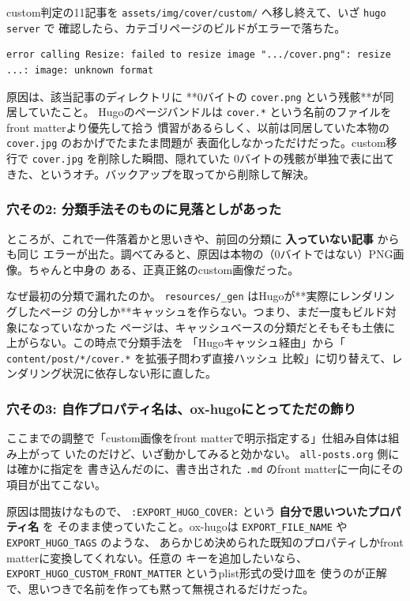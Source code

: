 \documentclass[11pt]{article}
\begin{document}
custom判定の11記事を \texttt{assets/img/cover/custom/} へ移し終えて、いざ \texttt{hugo server} で
確認したら、カテゴリページのビルドがエラーで落ちた。

\begin{verbatim}
error calling Resize: failed to resize image ".../cover.png": resize ...: image: unknown format
\end{verbatim}

原因は、該当記事のディレクトリに **0バイトの \texttt{cover.png} という残骸**が同居していたこと。
Hugoのページバンドルは \texttt{cover.*} という名前のファイルをfront matterより優先して拾う
慣習があるらしく、以前は同居していた本物の \texttt{cover.jpg} のおかげでたまたま問題が
表面化しなかっただけだった。custom移行で \texttt{cover.jpg} を削除した瞬間、隠れていた
0バイトの残骸が単独で表に出てきた、というオチ。バックアップを取ってから削除して解決。
\subsubsection{穴その2: 分類手法そのものに見落としがあった}
\label{sec:org55fc695}

ところが、これで一件落着かと思いきや、前回の分類に \textbf{入っていない記事} からも同じ
エラーが出た。調べてみると、原因は本物の（0バイトではない）PNG画像。ちゃんと中身の
ある、正真正銘のcustom画像だった。

なぜ最初の分類で漏れたのか。 \texttt{resources/\_gen} はHugoが**実際にレンダリングしたページ
の分しか**キャッシュを作らない。つまり、まだ一度もビルド対象になっていなかった
ページは、キャッシュベースの分類だとそもそも土俵に上がらない。この時点で分類手法を
「Hugoキャッシュ経由」から「 \texttt{content/post/*/cover.*} を拡張子問わず直接ハッシュ
比較」に切り替えて、レンダリング状況に依存しない形に直した。
\subsubsection{穴その3: 自作プロパティ名は、ox-hugoにとってただの飾り}
\label{sec:org2ba4a47}

ここまでの調整で「custom画像をfront matterで明示指定する」仕組み自体は組み上がって
いたのだけど、いざ動かしてみると効かない。 \texttt{all-posts.org} 側には確かに指定を
書き込んだのに、書き出された \texttt{.md} のfront matterに一向にその項目が出てこない。

原因は間抜けなもので、 \texttt{:EXPORT\_HUGO\_COVER:} という \textbf{自分で思いついたプロパティ名} を
そのまま使っていたこと。ox-hugoは \texttt{EXPORT\_FILE\_NAME} や \texttt{EXPORT\_HUGO\_TAGS} のような、
あらかじめ決められた既知のプロパティしかfront matterに変換してくれない。任意の
キーを追加したいなら、 \texttt{EXPORT\_HUGO\_CUSTOM\_FRONT\_MATTER} というplist形式の受け皿を
使うのが正解で、思いつきで名前を作っても黙って無視されるだけだった。
\end{document}
